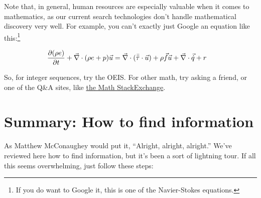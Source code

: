 Note that, in general, human resources are especially valuable when it comes to mathematics,
as our current search technologies don't handle mathematical discovery very
well. For example, you can't exactly just Google an equation like this:\footnote{If you do want to Google it, this is one of the Navier-Stokes equations.}

\begin{align}
      \pdv{(\rho e)}{t}+\vec{\nabla}\cdot(\rho e+p)\vec{u} &= \vec{\nabla}\cdot(\Bar{\Bar{\tau}}\cdot\vec{u})+\rho\vec{f}\vec{u}+\vec{\nabla}\cdot\vec{\dot{q}}+r
\end{align}

So, for integer sequences, try the OEIS. For other math, try asking a friend, or
one of the Q\&A sites, like \href{http://math.stackexchange.com/}{the Math StackExchange}.

\section{Summary: How to find information}

As Matthew McConaughey would put it, ``Alright, alright, alright.'' We've reviewed here how to find information, but it's been a sort of
lightning tour. If all this seems overwhelming, just follow these steps:

